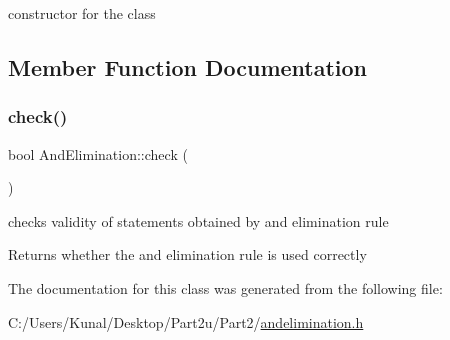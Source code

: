 constructor for the class 



\subsection{Member Function Documentation}
\mbox{\label{class_and_elimination_a851f0f5c687ae7d611d3954afaebd7a6}} 
\subsubsection{\texorpdfstring{check()}{check()}}
{\footnotesize\ttfamily bool And\+Elimination\+::check (\begin{DoxyParamCaption}{ }\end{DoxyParamCaption})\hspace{0.3cm}{\ttfamily [inline]}}



checks validity of statements obtained by and elimination rule 

\begin{DoxyReturn}{Returns}
whether the and elimination rule is used correctly 
\end{DoxyReturn}


The documentation for this class was generated from the following file\+:\begin{DoxyCompactItemize}
\item 
C\+:/\+Users/\+Kunal/\+Desktop/\+Part2u/\+Part2/\mbox{\hyperlink{andelimination_8h}{andelimination.\+h}}\end{DoxyCompactItemize}
